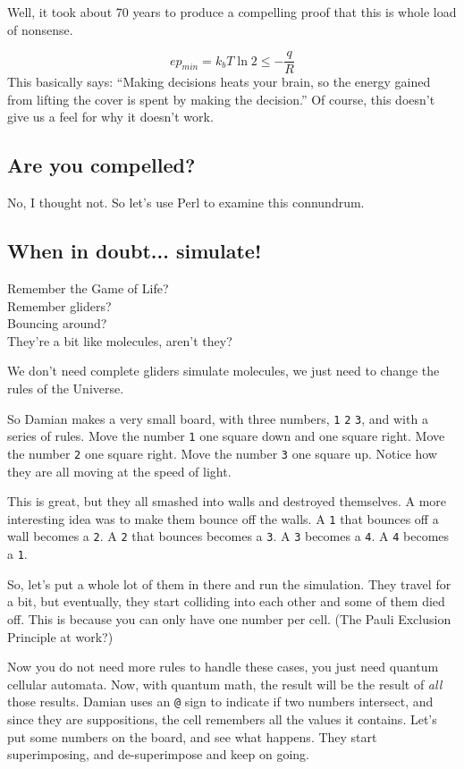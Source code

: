 \documentclass{article}
\begin{document}
Well, it took about 70 years to produce a compelling proof that 
this is whole load of nonsense.

\[ep_{min} = k_b T \ln 2 \le -\frac{q}{R}\]
This basically says: ``Making decisions heats your brain, so the energy 
gained from lifting the cover is spent by making the decision.''  
Of course, this doesn't give us a feel for why it doesn't work.

\subsection{Are you compelled?}
No, I thought not.  So let's use Perl to examine this connundrum.

\subsection{When in doubt... simulate!}
Remember the Game of Life?\\
Remember gliders?\\
Bouncing around?\\
They're a bit like molecules, aren't they?

We don't need complete gliders simulate molecules, we just need to 
change the rules of the Universe.

So Damian makes a very small board, with three numbers, \verb'1'
\verb'2' \verb'3', and with a series of rules.  Move the number \verb'1'
one square down and one square right.  Move the number \verb'2' one
square right.  Move the number \verb'3' one square up.  Notice how they
are all moving at the speed of light.

This is great, but they all smashed into walls and destroyed themselves.
A more interesting idea was to make them bounce off the walls.  A
\verb'1' that bounces off a wall becomes a \verb'2'.  A \verb'2' that
bounces becomes a \verb'3'.  A \verb'3' becomes a \verb'4'.  A \verb'4'
becomes a \verb'1'.

So, let's put a whole lot of them in there and run the simulation.  
They travel for a bit, but eventually, they start colliding into
each other and some of them died off.  This
is because you can only have one number per cell.  (The Pauli Exclusion
Principle at work?)

Now you do not need more rules to handle these cases, you just need
quantum cellular automata.  Now, with quantum math, the result will be
the result of \emph{all} those results.  Damian uses an \verb'@' sign to
indicate if two numbers intersect, and since they are suppositions, the
cell remembers all the values it contains.  Let's put some numbers on
the board, and see what happens.  They start superimposing, and
de-superimpose and keep on going.
\end{document}
